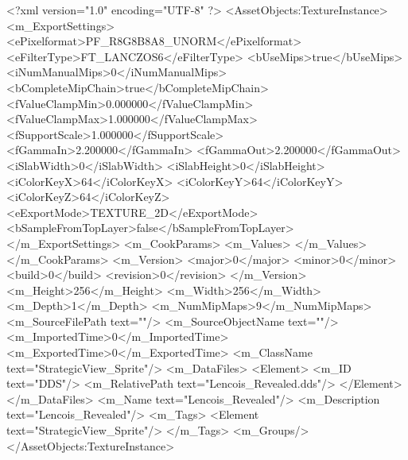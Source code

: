 <?xml version="1.0" encoding="UTF-8" ?>
<AssetObjects:TextureInstance>
    <m_ExportSettings>
        <ePixelformat>PF_R8G8B8A8_UNORM</ePixelformat>
        <eFilterType>FT_LANCZOS6</eFilterType>
        <bUseMips>true</bUseMips>
        <iNumManualMips>0</iNumManualMips>
        <bCompleteMipChain>true</bCompleteMipChain>
        <fValueClampMin>0.000000</fValueClampMin>
        <fValueClampMax>1.000000</fValueClampMax>
        <fSupportScale>1.000000</fSupportScale>
        <fGammaIn>2.200000</fGammaIn>
        <fGammaOut>2.200000</fGammaOut>
        <iSlabWidth>0</iSlabWidth>
        <iSlabHeight>0</iSlabHeight>
        <iColorKeyX>64</iColorKeyX>
        <iColorKeyY>64</iColorKeyY>
        <iColorKeyZ>64</iColorKeyZ>
        <eExportMode>TEXTURE_2D</eExportMode>
        <bSampleFromTopLayer>false</bSampleFromTopLayer>
    </m_ExportSettings>
    <m_CookParams>
        <m_Values>
        </m_Values>
    </m_CookParams>
    <m_Version>
        <major>0</major>
        <minor>0</minor>
        <build>0</build>
        <revision>0</revision>
    </m_Version>
    <m_Height>256</m_Height>
    <m_Width>256</m_Width>
    <m_Depth>1</m_Depth>
    <m_NumMipMaps>9</m_NumMipMaps>
    <m_SourceFilePath text=""/>
    <m_SourceObjectName text=""/>
    <m_ImportedTime>0</m_ImportedTime>
    <m_ExportedTime>0</m_ExportedTime>
    <m_ClassName text="StrategicView_Sprite"/>
    <m_DataFiles>
        <Element>
            <m_ID text="DDS"/>
            <m_RelativePath text="Lencois_Revealed.dds"/>
        </Element>
    </m_DataFiles>
    <m_Name text="Lencois_Revealed"/>
    <m_Description text="Lencois_Revealed"/>
    <m_Tags>
        <Element text="StrategicView_Sprite"/>
    </m_Tags>
    <m_Groups/>
</AssetObjects:TextureInstance>
